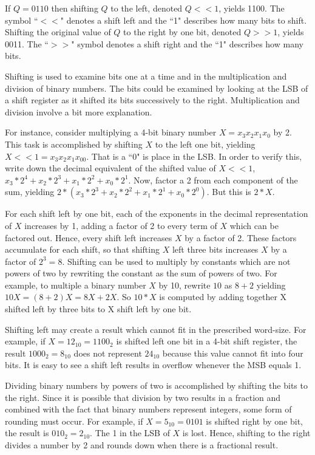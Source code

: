 If $Q=0110$ then shifting $Q$ to the left, denoted $Q<<1$, 
yields 1100.  The symbol ``$<<$" denotes a shift left and the ``1"
describes how many bits to shift.  Shifting the original 
value of $Q$ to the right by one bit, denoted $Q>>1$, yields 
0011.  The ``$>>$" symbol denotes a shift right and the ``1"
describes how many bits.

Shifting is used to examine bits one at a time and in the 
multiplication and division of binary numbers.  The bits 
could be examined by looking at the LSB of a shift register 
as it shifted its bits successively to the right.  
Multiplication and division involve a bit more explanation.

For instance, consider multiplying a 4-bit binary number 
$X=x_3 x_2 x_1 x_0$  by 2.  This task is accomplished by shifting 
$X$ to the left one bit, yielding $X<<1=x_3 x_2 x_1 x_00$.  That
is a ``0" is place in the LSB.
In order to verify this, write down the decimal equivalent of 
the shifted value of $X<<1$, $x_3*2^4 +x_2*2^3 +x_1*2^2 +x_0*2^1$.  
Now, factor a 2 from each component of the sum, yielding
$2*(x_3*2^3 +x_2*2^2 +x_1*2^1 +x_0*2^0)$.  But this is $2*X$.  

For each shift left by one bit, each of the exponents in the 
decimal representation of $X$ increases by 1, adding a factor of 
2 to every term of $X$ which can be factored out.  Hence, every 
shift left increases $X$ by a factor of 2.  These factors 
accumulate for each shift, so that shifting $X$ left three bits 
increases $X$ by a factor of $2^3=8$.  Shifting can be used to 
multiply by constants which are not powers of two by rewriting the 
constant as the sum of powers of two.  For example, \label{page:MulyBy10} 
to multiple a binary number $X$ by 10, rewrite $10$ 
as $8+2$ yielding $10X = (8+2)X = 8X+2X$.  So $10*X$ is computed
by adding together X shifted left by three bits to X shift left by one bit.

Shifting left may create a result
which cannot fit in the prescribed word-size.  For example, if
$X=12_{10}=1100_2$ is shifted left one bit in a 4-bit shift register,
the result $1000_2 = 8_{10}$ does not represent $24_{10}$ because
this value cannot fit into four bits.  It is easy to see a shift left
results in overflow whenever the MSB equals 1.

Dividing binary numbers by powers of two is accomplished by
shifting the bits to the right.  Since it is possible that division by
two results in a fraction and combined with the fact that binary numbers
represent integers, some form of rounding must occur.  For example, 
if $X=5_{10}=0101$ is shifted right by one bit, the result is
$010_2=2_{10}$.  The 1 in the LSB of $X$ is lost.  Hence, shifting
to the right divides a number by 2 and rounds down when there
is a fractional result.

